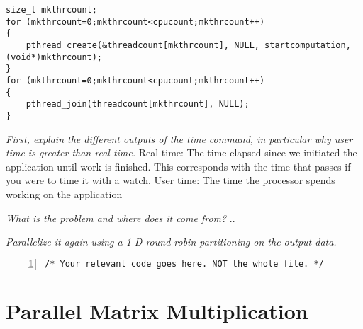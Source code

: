 \documentclass{article}
\begin{document}
\begin{ExerciseList}
\begin{lstlisting}
size_t mkthrcount;
for (mkthrcount=0;mkthrcount<cpucount;mkthrcount++)
{
	pthread_create(&threadcount[mkthrcount], NULL, startcomputation, (void*)mkthrcount);
}
for (mkthrcount=0;mkthrcount<cpucount;mkthrcount++)
{
	pthread_join(threadcount[mkthrcount], NULL);
}
\end{lstlisting}

\Question
{}
\emph{First, explain the different outputs of the time command, in
  particular why user time is greater than real time.}
\Answer Real time: The time elapsed since we initiated the application until work is finished. This corresponds with the time that passes if you were to time it with a watch. \newline
User time: The time the processor spends working on the application

\Question
{} \emph{What is the problem and where does it come from?}
\Answer .. %

\Question
\emph{Parallelize it again using a 1-D round-robin partitioning on the
  output data.}

\begin{lstlisting}[basicstyle=\small\sffamily,
keywords={break,case,const,continue,default,else,enum,
for,if,return,switch,while,do,long,void,int,float,double,
char,struct,typedef,include,size\_t},
keywordstyle={\color{blue}},
comment={[l]{//}}, morecomment={[s]{/*}{*/}}, commentstyle=\itshape,
columns={[l]flexible}, numbers=left, numberstyle=\tiny,
frameround=fftt, frame=shadowbox, captionpos=b,
caption={Parallelized computation of Mandelbrot's set.},
label=LST:mandelbrot2]
/* Your relevant code goes here. NOT the whole file. */
\end{lstlisting}

\end{ExerciseList}

\section{Parallel Matrix Multiplication}
\end{document}
